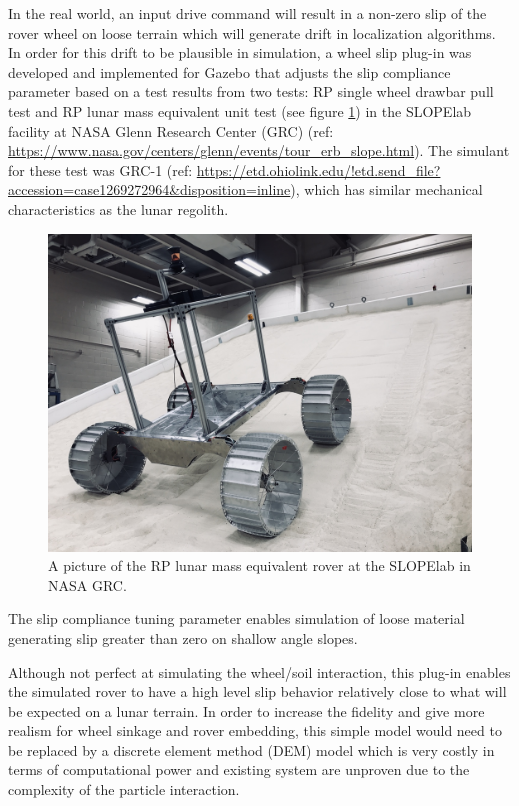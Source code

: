 \documentclass[twocolumn,letterpaper]{IEEEAerospaceCLS}  %
\begin{document}
In the real world, an input drive command will result in a non-zero slip of the rover wheel on loose terrain which will generate drift in localization algorithms.
In order for this drift to be plausible in simulation, a wheel slip plug-in was developed and implemented for Gazebo that adjusts the slip compliance parameter based on a test results from two tests: RP single wheel drawbar pull test and RP lunar mass equivalent unit test (see figure \ref{fig:mgru}) in the SLOPElab facility at NASA Glenn Research Center (GRC) (ref: \url{https://www.nasa.gov/centers/glenn/events/tour_erb_slope.html}). The simulant for these test was GRC-1 (ref: \url{https://etd.ohiolink.edu/!etd.send_file?accession=case1269272964&disposition=inline}), which has similar mechanical characteristics as the lunar regolith.
\begin{figure}[h!]
	\includegraphics[width=\columnwidth]{figures/wheel_slip_MGRU.JPG}
   	\caption{A picture of the RP lunar mass equivalent rover at the SLOPElab in NASA GRC.}
    \label{fig:mgru}
\end{figure}
The slip compliance tuning parameter enables simulation of loose material generating slip greater than zero on shallow angle slopes.

Although not perfect at simulating the wheel/soil interaction, this plug-in enables the simulated rover to have a high level slip behavior relatively close to what will be expected on a lunar terrain. In order to increase the fidelity and give more realism for wheel sinkage and rover embedding, this simple model would need to be replaced by a discrete element method (DEM) model which is very costly in terms of computational power and existing system are unproven due to the complexity of the particle interaction.
\end{document}
